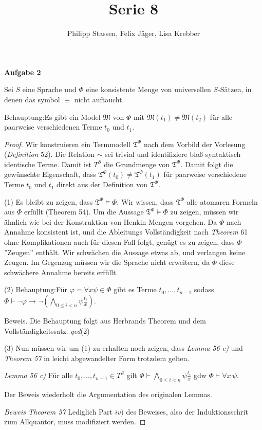 \documentclass{article}
\title{Serie 8}
\author{Philipp Stassen, Felix Jäger, Lisa Krebber}
\newcommand{\model}{\mathfrak{M}}
\newcommand{\claim}{\textsf{Behauptung}:\hspace{0,2cm}}
\theoremstyle{definition}
\theoremstyle{plain}
\theoremstyle{remark}
\newcommand{\aufgabe}[1]{
	{
		\vspace*{0.5cm}
		\textsf{\textbf{Aufgabe #1}}
		\vspace*{0.2cm}

	}
}
\begin{document}
\maketitle
\aufgabe2 Sei $S$ eine Sprache und $\Phi$ eine konsistente Menge von universellen $S$-Sätzen, in denen das symbol $\equiv$ nicht auftaucht.

\claim Es gibt ein Model $\model$ von $\Phi$ mit $\model(t_1) \neq \model(t_2)$ für alle paarweise verschiedenen Terme $t_0$ und $t_1$.
\begin{proof}
	Wir konstruieren ein Termmodell $\mathfrak{T}^{\Phi}$ nach dem Vorbild der Vorlesung (\textit{Definition} 52). Die Relation $\sim$ sei trivial und identifiziere bloß syntaktisch identische Terme. Damit ist $T^S$ die Grundmenge von $\mathfrak{T}^{\Phi}$. Damit folgt die gewünschte Eigenschaft, dass $\mathfrak{T}^{\Phi}(t_0)\neq\mathfrak{T}^{\Phi}(t_1)$ für paarweise verschiedene Terme $t_0$ und $t_1$ direkt aus der Definition von $\mathfrak{T}^{\Phi}$. \medskip

	(1) Es bleibt zu zeigen, dass $\mathfrak{T}^{\Phi}\vDash \Phi$. Wir wissen, dass $\mathfrak{T}^{\Phi}$ alle atomaren Formeln aus $\Phi$ erfüllt (Theorem 54). Um die Aussage $\mathfrak{T}^{\Phi}\vDash \Phi$ zu zeigen, müssen wir ähnlich wie bei der Konstruktion von Henkin Mengen vorgehen. Da $\Phi$ nach Annahme konsistent ist, und die Ableitungs Vollständigkeit nach \textit{Theorem} 61 ohne Komplikationen auch für diesen Fall folgt, genügt es zu zeigen, dass $\Phi$ ''Zeugen'' enthält. Wir schwächen die Aussage etwas ab, und verlangen keine Zeugen. Im Gegenzug müssen wir die Sprache nicht erweitern, da $\Phi$ diese schwächere Annahme bereits erfüllt.\medskip

	(2) \claim Für $\varphi = \forall x \psi \in \Phi$ gibt es Terme $t_0,...,t_{n-1}$ sodass $\Phi \vdash \neg\varphi \to \neg(\bigwedge_{0\leq i< n}\psi\frac{t_i}{x})$.

	Beweis.
	Die Behauptung folgt aus Herbrands Theorem und dem Vollständigkeitssatz. \textit{qed}(2) \medskip

	(3) Nun müssen wir um (1) zu erhalten noch zeigen, dass \emph{Lemma 56 c)} und \emph{Theorem 57} in leicht abgewandelter Form trotzdem gelten.
	
	\emph{Lemma 56 c)} Für alle $t_0,...,t_{n-1}\in T^S$ gilt $\Phi \vdash \bigwedge_{0\leq i <n} \psi \frac{t_i}{x}$ gdw $\Phi \vdash \forall x \,\psi$. 

	Der Beweis wiederholt die Argumentation des originalen Lemmas.\medskip

	\emph{Beweis Theorem 57} Lediglich Part $iv)$ des Beweises, also der Induktionsschrit zum Allquantor, muss modifiziert werden.
\end{proof}
\end{document}
